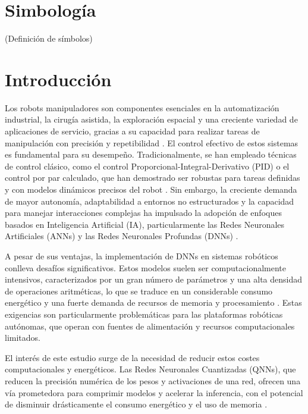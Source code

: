 \documentclass[12pt]{article}
\begin{document}
\newpage
\section*{Simbología}
(Definición de símbolos)


\newpage
{}

\section*{Introducción}
Los robots manipuladores son componentes esenciales en la automatización industrial, la cirugía asistida, la exploración espacial y una creciente variedad de aplicaciones de servicio, gracias a su capacidad para realizar tareas de manipulación con precisión y repetibilidad \cite{modern_robotics}. El control efectivo de estos sistemas es fundamental para su desempeño. Tradicionalmente, se han empleado técnicas de control clásico, como el control Proporcional-Integral-Derivativo (PID) o el control por par calculado, que han demostrado ser robustas para tareas definidas y con modelos dinámicos precisos del robot \cite{modern_robotics}. Sin embargo, la creciente demanda de mayor autonomía, adaptabilidad a entornos no estructurados y la capacidad para manejar interacciones complejas ha impulsado la adopción de enfoques basados en Inteligencia Artificial (IA), particularmente las Redes Neuronales Artificiales (ANNs) y las Redes Neuronales Profundas (DNNs) \cite{JuarezLora2024Thesis, Park2025electronics}.

A pesar de sus ventajas, la implementación de DNNs en sistemas robóticos conlleva desafíos significativos. Estos modelos suelen ser computacionalmente intensivos, caracterizados por un gran número de parámetros y una alta densidad de operaciones aritméticas, lo que se traduce en un considerable consumo energético y una fuerte demanda de recursos de memoria y procesamiento \cite{Chen2021memristor, Liang2021PruningSurvey}. Estas exigencias son particularmente problemáticas para las plataformas robóticas autónomas, que operan con fuentes de alimentación y recursos computacionales limitados\cite{Bartolozzi2022embodied, deVriesGao2025AIenergy}.

El interés de este estudio surge de la necesidad de reducir estos costes computacionales y energéticos. Las Redes Neuronales Cuantizadas (QNNs), que reducen la precisión numérica de los pesos y activaciones de una red, ofrecen una vía prometedora para comprimir modelos y acelerar la inferencia, con el potencial de disminuir drásticamente el consumo energético y el uso de memoria \cite{Liang2021PruningSurvey, ZhangL2025FLQ}.
\end{document}

